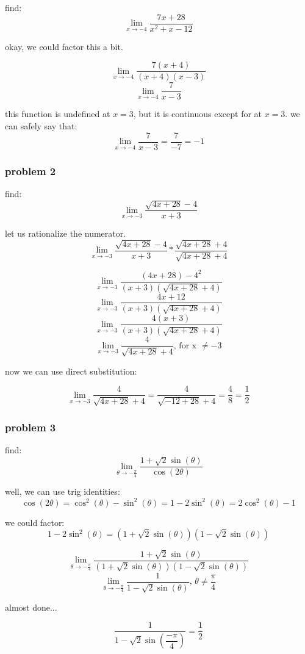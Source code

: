 \documentclass[11pt,a4paper]{article}
\begin{document}
find:
$$\lim \limits_{x \to -4} \frac{7x+28}{x^2+x-12}$$

okay, we could factor this a bit.

$$\lim \limits_{x \to -4} \frac{7(x+4)}{(x+4)(x-3)}$$
$$\lim \limits_{x \to -4} \frac{7}{x-3}$$

this function is undefined at $x=3$, but it is continuous except for at $x=3$. we can safely say that:
$$\lim \limits_{x \to -4} \frac{7}{x-3} = \frac{7}{-7} = -1$$

\subsubsection{problem 2}

find:
$$\lim \limits_{x \to -3} \frac{\sqrt{4x+28}-4}{x+3}$$

let us rationalize the numerator.
$$\lim \limits_{x \to -3} \frac{\sqrt{4x+28}-4}{x+3}*\frac{\sqrt{4x+28}+4}{\sqrt{4x+28}+4}$$

$$\lim \limits_{x \to -3} \frac{(4x+28)-4^2}{(x+3)(\sqrt{4x+28}+4)}$$
$$\lim \limits_{x \to -3} \frac{4x+12}{(x+3)(\sqrt{4x+28}+4)}$$
$$\lim \limits_{x \to -3} \frac{4(x+3)}{(x+3)(\sqrt{4x+28}+4)}$$
$$\lim \limits_{x \to -3} \frac{4}{\sqrt{4x+28}+4}\text{, for x }\neq -3$$

now we can use direct substitution:

$$\lim \limits_{x \to -3} \frac{4}{\sqrt{4x+28}+4} = \frac{4}{\sqrt{-12+28}+4} = \frac{4}{8} = \frac{1}{2}$$

\subsubsection{problem 3}
find:
$$\lim \limits_{\theta \to -\frac{\pi}{4}} \frac{1+\sqrt{2}\sin(\theta)}{\cos(2\theta)}$$

well, we can use trig identities:
$$\cos(2\theta)=\cos^2(\theta)-\sin^2(\theta)=1-2\sin^2(\theta)=2\cos^2(\theta)-1$$

we could factor:
$$1-2\sin^2(\theta) = (1+\sqrt{2}\sin(\theta))(1-\sqrt{2}\sin(\theta))$$

$$\lim \limits_{\theta \to -\frac{\pi}{4}} \frac{1+\sqrt{2}\sin(\theta)}{(1+\sqrt{2}\sin(\theta))(1-\sqrt{2}\sin(\theta))}$$
$$\lim \limits_{\theta \to -\frac{\pi}{4}} \frac{1}{1-\sqrt{2}\sin(\theta)} \text{, }\theta \neq \frac{\pi}{4}$$

almost done...

$$\frac{1}{1-\sqrt{2}\sin\left(\dfrac{-\pi}{4}\right)} = \frac{1}{2}$$
\end{document}
